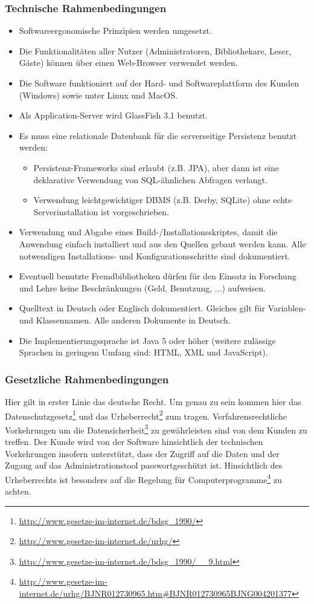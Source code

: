 \documentclass[fontsize=12pt,paper=a4,twoside]{scrartcl}
\begin{document}
\subsubsection{Technische Rahmenbedingungen}
\begin{itemize}

\item Softwareergonomische Prinzipien werden umgesetzt.
\item Die Funktionalitäten aller Nutzer (Administratoren, Bibliothekare, Leser, Gäste) können über einen Web-Browser verwendet werden.
\item Die Software funktioniert auf der Hard- und Softwareplattform des Kunden (Windows) sowie unter Linux und MacOS.
\item Als Application-Server wird GlassFish 3.1 benutzt.
\item Es muss eine relationale Datenbank für die serverseitige Persistenz benutzt werden:
\begin{itemize}
\item Persistenz-Frameworks sind erlaubt (z.B. JPA), aber dann ist eine deklarative Verwendung von SQL-ähnlichen Abfragen verlangt.
\item Verwendung leichtgewichtiger DBMS (z.B. Derby, SQLite) ohne echte Serverinstallation ist vorgeschrieben.
\end{itemize}
\item Verwendung und Abgabe eines Build-/Installationsskriptes, damit die Anwendung einfach installiert und aus den Quellen gebaut werden kann. Alle notwendigen Installations- und Konfigurationsschritte sind dokumentiert.
\item Eventuell benutzte Fremdbibliotheken dürfen für den Einsatz in Forschung und Lehre keine Beschränkungen (Geld, Benutzung, ...) aufweisen.
\item Quelltext in Deutsch oder Englisch dokumentiert. Gleiches gilt für Variablen- und Klassennamen. Alle anderen Dokumente in Deutsch.
\item Die Implementierungssprache ist Java 5 oder höher (weitere zulässige Sprachen in geringem Umfang sind: HTML, XML und JavaScript).
\end{itemize}

\newpage
\subsubsection{Gesetzliche Rahmenbedingungen}

Hier gilt in erster Linie das deutsche Recht. Um genau zu sein kommen hier das Datenschutzgesetz\footnote{\url{http://www.gesetze-im-internet.de/bdsg_1990/}} und das Urheberrecht\footnote{\url{http://www.gesetze-im-internet.de/urhg/}} zum tragen. Verfahrensrechtliche Vorkehrungen um die Datensicherheit\footnote{\url{http://www.gesetze-im-internet.de/bdsg_1990/__9.html}} zu gewährleisten sind von dem Kunden zu treffen. Der Kunde wird von der Software hinsichtlich der technischen Vorkehrungen insofern unterstützt, dass der Zugriff auf die Daten und der Zugang auf das Administrationstool passwortgeschützt ist.
Hinsichtlich des Urheberrechts ist besonders auf die Regelung für Computerprogramme\footnote{\url{http://www.gesetze-im-internet.de/urhg/BJNR012730965.htm\#BJNR012730965BJNG004201377}} zu achten.
 
\end{document}
